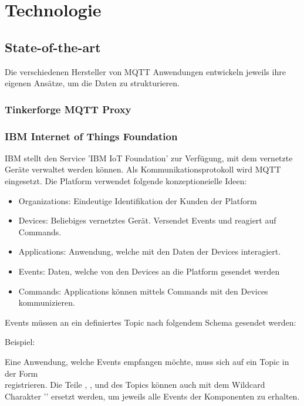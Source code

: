 \chapter{Technologie}
\label{chap:technologie}


\section{State-of-the-art}
Die verschiedenen Hersteller von MQTT Anwendungen entwickeln jeweils ihre eigenen Ansätze, um die Daten zu strukturieren. 

\subsection{Tinkerforge MQTT Proxy}

\subsection{IBM Internet of Things Foundation}

IBM stellt den Service 'IBM IoT Foundation' zur Verfügung, mit dem vernetzte Geräte verwaltet werden können. Als Kommunikationsprotokoll wird MQTT eingesetzt. Die Platform verwendet folgende konzeptioneielle Ideen:
\begin{itemize}
    \item Organizations: Eindeutige Identifikation der Kunden der Platform
	\item Devices: Beliebiges vernetztes Gerät. Versendet Events und reagiert auf Commands.
	\item Applications: Anwendung, welche mit den Daten der Devices interagiert.
	\item Events: Daten, welche von den Devices an die Platform gesendet werden
	\item Commands: Applications können mittels Commands mit den Devices kommunizieren.
\end{itemize}

Events müssen an ein definiertes Topic nach folgendem Schema gesendet werden: \\

Beispiel: 

Eine Anwendung, welche Events empfangen möchte, muss sich auf ein Topic in der Form \\
 registrieren.
Die Teile , ,  und  des Topics können auch mit dem Wildcard Charakter '\code{+}' ersetzt werden, um jeweils alle Events der Komponenten zu erhalten. 


